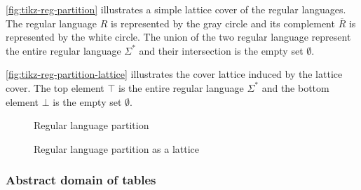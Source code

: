 \begin{example}
    \autoref{fig:tikz-reg-partition} illustrates a simple lattice cover of the regular languages. The regular language $R$ is represented by the gray circle and its complement $\overline{R}$ is represented by the white circle. The union of the two regular language represent the entire regular language $\Sigma^*$ and their intersection is the empty set $\emptyset$.

    \autoref{fig:tikz-reg-partition-lattice} illustrates the cover lattice induced by the lattice cover. The top element $\top$ is the entire regular language $\Sigma^*$ and the bottom element $\bot$ is the empty set $\emptyset$.
\end{example}

\begin{figure}
    \center
    \caption{Regular language partition}
    \label{fig:tikz-reg-partition}
\end{figure}


\begin{figure}[!htb]
    \center
    \caption{Regular language partition as a lattice}
    \label{fig:tikz-reg-partition-lattice}
\end{figure}

\subsubsection{Abstract domain of tables}\label{subsubsec:abstract_domain_of_tables}

